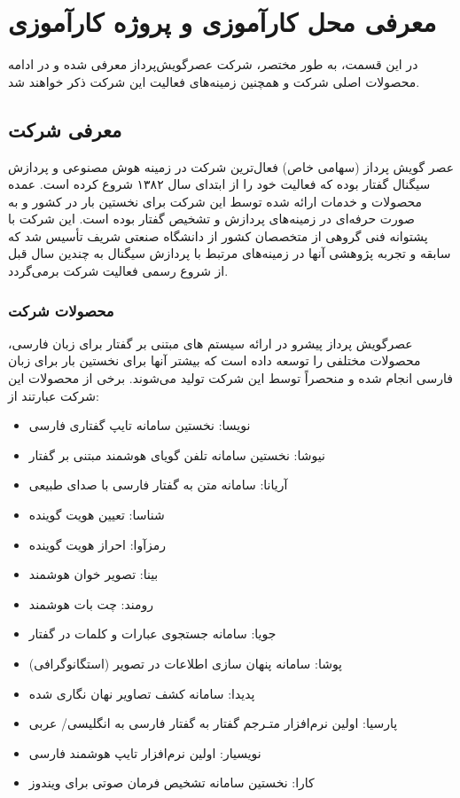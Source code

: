 \chapter{معرفی محل کارآموزی و پروژه کارآموزی}

در این قسمت، به طور مختصر، شرکت عصرگویش‌پرداز معرفی شده و در ادامه محصولات اصلی شرکت و همچنین زمینه‌های فعالیت این شرکت ذکر خواهند شد.

\section{معرفی شرکت}

عصر گویش پرداز (سهامی خاص) فعال‌ترین شرکت در زمینه هوش مصنوعی و پردازش سیگنال گفتار بوده كه فعالیت خود را از ابتدای سال ۱۳۸۲ شروع كرده است. عمده محصولات و خدمات ارائه شده توسط این شرکت برای نخستین بار در کشور و به صورت حرفه‌ای در زمینه‌های پردازش و تشخیص گفتار بوده است. این شرکت با پشتوانه فنی گروهی از متخصصان کشور از دانشگاه صنعتی شریف تأسیس شد که سابقه و تجربه پژوهشی آنها در زمینه‌های مرتبط با پردازش سیگنال به چندین سال قبل از شروع رسمی فعالیت شرکت برمی‌گردد.

\subsection{محصولات شرکت}

عصرگویش پرداز پیشرو در ارائه سیستم های مبتنی بر گفتار برای زبان فارسی، محصولات مختلفی را توسعه داده است که بیشتر آنها برای نخستین بار برای زبان فارسی انجام شده و منحصراً توسط این شرکت تولید می‌شوند. برخی از محصولات این شرکت عبارتند از:
\begin{itemize}
	\item نویسا: نخستین سامانه تایپ گفتاری فارسی
	\item نیوشا: نخستین سامانه تلفن گویای هوشمند مبتنی بر گفتار
	\item آریانا: سامانه متن به گفتار فارسی با صدای طبیعی
	\item شناسا: تعیین هویت گوینده
	\item رمزآوا: احراز هویت گوینده
	\item بینا: تصویر خوان هوشمند
	\item رومند: چت بات هوشمند
	\item جویا: سامانه جستجوی عبارات و کلمات در گفتار
	\item پوشا: سامانه پنهان سازی اطلاعات در تصویر (استگانوگرافی)
	\item پدیدا: سامانه کشف تصاویر نهان نگاری شده
	\item پارسیا: اولین نرم‌افزار متـرجم گفتار به گفتار فارسی به انگلیسی/ عربی
	\item نویسیار: اولین نرم‌افزار تایپ هوشمند فارسی
	\item کارا: نخستین سامانه تشخیص فرمان صوتی برای ویندوز
\end{itemize}

